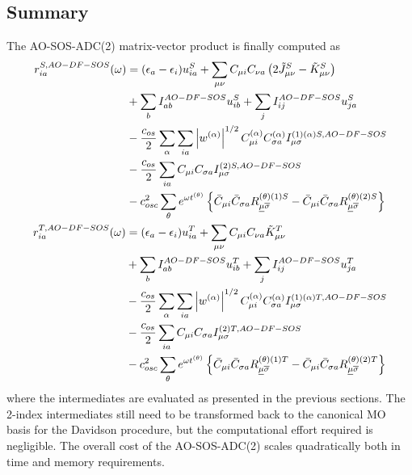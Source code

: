 \subsection{Summary}

The AO-SOS-ADC(2) matrix-vector product is finally computed as
\begin{align}
\begin{split}
r_{ia}^{S,AO-DF-SOS}(\omega) &= (\epsilon_a - \epsilon_i) u_{ia}^S + \sum_{\mu\nu} C_{\mu i} C_{\nu a} \left( 2\tilde{J}^S_{\mu\nu} - \tilde{K}^S_{\mu\nu} \right) \\
&+ \sum_b I_{ab}^{AO-DF-SOS} u_{ib}^S + \sum_j I_{ij}^{AO-DF-SOS} u_{ja}^S \\
&- \frac{c_{os}}{2} \sum_{\alpha} \sum_{ia} \left\lvert w^{(\alpha)} \right\rvert^{1/2} C_{\mu i}^{(\alpha)} C_{\sigma a}^{(\alpha)} I_{\mu\sigma}^{(1)(\alpha)S,AO-DF-SOS} \\
&- \frac{c_{os}}{2} \sum_{ia} C_{\mu i} C_{\sigma a} I_{\mu\sigma}^{(2)S,AO-DF-SOS} \\
&- c_{osc}^2 \sum_{\theta} e^{\omega t^{(\theta)}} \left\lbrace \bar{C}_{\mu i} \bar{C}_{\sigma a} R^{(\theta)(1)S}_{\underline{\mu}\overline{\sigma}} - \bar{C}_{\mu i} \bar{C}_{\sigma a} R^{(\theta)(2)S}_{\underline{\mu}\overline{\sigma}} \right\rbrace
\end{split}
\\
\begin{split}
r_{ia}^{T,AO-DF-SOS}(\omega) &= (\epsilon_a - \epsilon_i) u_{ia}^T + \sum_{\mu\nu} C_{\mu i} C_{\nu a} \tilde{K}^T_{\mu\nu} \\
&+ \sum_b I_{ab}^{AO-DF-SOS} u_{ib}^T + \sum_j I_{ij}^{AO-DF-SOS} u_{ja}^T \\
&- \frac{c_{os}}{2} \sum_{\alpha} \sum_{ia} \left\lvert w^{(\alpha)} \right\rvert^{1/2} C_{\mu i}^{(\alpha)} C_{\sigma a}^{(\alpha)} I_{\mu\sigma}^{(1)(\alpha)T,AO-DF-SOS} \\
&- \frac{c_{os}}{2} \sum_{ia} C_{\mu i} C_{\sigma a} I_{\mu\sigma}^{(2)T,AO-DF-SOS} \\
& - c_{osc}^2 \sum_{\theta} e^{\omega t^{(\theta)}} \left\lbrace \bar{C}_{\mu i} \bar{C}_{\sigma a} R^{(\theta)(1)T}_{\underline{\mu}\overline{\sigma}} - \bar{C}_{\mu i} \bar{C}_{\sigma a} R^{(\theta)(2)T}_{\underline{\mu}\overline{\sigma}} \right\rbrace
\end{split}
\end{align}
\noindent where the intermediates are evaluated as presented in the previous sections. The 2-index intermediates still need to be transformed back to the canonical MO basis for the Davidson procedure, but the computational effort required is negligible. The overall cost of the AO-SOS-ADC(2) scales quadratically both in time and memory requirements.

